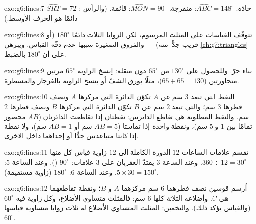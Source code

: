 \begin{solution}{exo:g6:lines:7}
$\widehat{SRT} = 72^\circ$: حادّة. \quad
$\widehat{ABC} = 148^\circ$: منفرجة. \quad
$\widehat{MON} = 90^\circ$: قائمة. (والرأس دائمًا هو الحرف
الأوسط.)
\end{solution}

\begin{solution}{exo:g6:lines:8}
تتوقّف القياسات على المثلث المرسوم، لكن  الزوايا الثلاث
دائمًا $180^\circ$ (أو قريب جدًّا منه) --- والفروق الصغيرة سببها
عدم دقّة القياس. ويبرهن \cref{ch:g7:triangles} على أن 
$180^\circ$ بالضبط.
\end{solution}

\begin{solution}{exo:g6:lines:9}
بناء حرّ. وللحصول على $130^\circ$ من $65^\circ$ دون
منقلة: اِنسخ الزاوية $65^\circ$ مرتين متجاورتين ($65 + 65 =
130$)، مثلًا بورق الشفّ أو بنسخ الزاوية بالفرجار
والمسطرة.
\end{solution}

\begin{solution}{exo:g6:lines:10}
النقط التي تبعد $3$ سم عن $A$ تكوّن الدائرة التي مركزها $A$ ونصف
قطرها $3$ سم؛ والتي تبعد $2$ سم عن $B$ تكوّن الدائرة التي مركزها $B$
ونصف قطرها $2$ سم. والنقط المطلوبة هي تقاطع الدائرتين:
نقطتان إذا تقاطعت الدائرتان ($AB$ محصور تمامًا بين $1$ و
$5$ سم)، ونقطة واحدة إذا تماستا ($AB = 5$ سم أو $AB = 1$ سم)، ولا نقطة إذا
كانتا متباعدتين جدًّا أو إحداهما داخل الأخرى.
\end{solution}

\begin{solution}{exo:g6:lines:11}
تقسم علامات الساعات $12$ الدورة الكاملة إلى $12$ زاوية قياس كل منها
$360 \div 12 = 30^\circ$. وعند الساعة 3 يمتدّ العقربان على $3$ علامات:
$90^\circ$ (). وعند الساعة 5: $5 \times 30 = 150^\circ$.
وعند الساعة 6: $180^\circ$ (زاوية مستقيمة).
\end{solution}

\begin{solution}{exo:g6:lines:12}
اُرسم قوسين نصف قطرهما $6$ سم مركزهما $A$ و $B$؛ ونقطة
تقاطعهما هي $C$. وأضلاعه الثلاثة كلها $6$ سم: فالمثلث
متساوي الأضلاع، وكل زاوية فيه $60^\circ$ (والقياس يؤكد
ذلك). والتخمين: المثلث المتساوي الأضلاع له ثلاث زوايا متساوية قياسها
$60^\circ$.
\end{solution}

